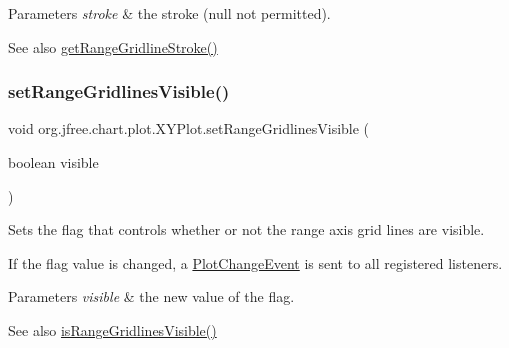 \begin{DoxyParams}{Parameters}
{\em stroke} & the stroke ({\ttfamily null} not permitted).\\
\hline
\end{DoxyParams}
\begin{DoxySeeAlso}{See also}
\mbox{\hyperlink{classorg_1_1jfree_1_1chart_1_1plot_1_1_x_y_plot_a4d382725d310ef5f421a94fbd8409e70}{get\+Range\+Gridline\+Stroke()}} 
\end{DoxySeeAlso}
\mbox{\label{classorg_1_1jfree_1_1chart_1_1plot_1_1_x_y_plot_a0d2df1446c52a5f9446947bf4e5ae7da}} 
\subsubsection{\texorpdfstring{set\+Range\+Gridlines\+Visible()}{setRangeGridlinesVisible()}}
{\footnotesize\ttfamily void org.\+jfree.\+chart.\+plot.\+X\+Y\+Plot.\+set\+Range\+Gridlines\+Visible (\begin{DoxyParamCaption}\item[{boolean}]{visible }\end{DoxyParamCaption})}

Sets the flag that controls whether or not the range axis grid lines are visible. 

If the flag value is changed, a \mbox{\hyperlink{}{Plot\+Change\+Event}} is sent to all registered listeners.


\begin{DoxyParams}{Parameters}
{\em visible} & the new value of the flag.\\
\hline
\end{DoxyParams}
\begin{DoxySeeAlso}{See also}
\mbox{\hyperlink{classorg_1_1jfree_1_1chart_1_1plot_1_1_x_y_plot_a16bed12a303c489f3ff2a19e03ae63a7}{is\+Range\+Gridlines\+Visible()}} 
\end{DoxySeeAlso}
\mbox{\label{classorg_1_1jfree_1_1chart_1_1plot_1_1_x_y_plot_acc1ac8ab3f7e5f4fb3d69723c1bc8b09}} 
